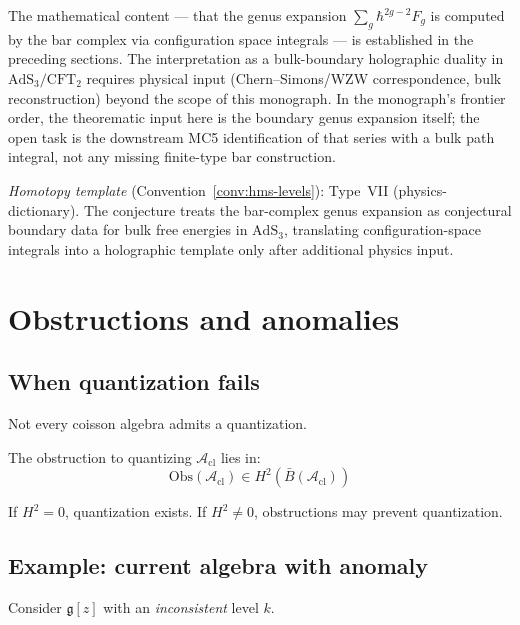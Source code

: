 \begin{remark}[Scope]
The mathematical content --- that the genus expansion $\sum_g \hbar^{2g-2} F_g$ is computed by the bar complex via configuration space integrals --- is established in the preceding sections.  The interpretation as a bulk-boundary holographic duality in $\mathrm{AdS}_3/\mathrm{CFT}_2$ requires physical input (Chern--Simons/WZW correspondence, bulk reconstruction) beyond the scope of this monograph.
In the monograph's frontier order, the theorematic input here is the boundary genus expansion itself; the open task is the downstream MC5 identification of that series with a bulk path integral, not any missing finite-type bar construction.

\emph{Homotopy template} (Convention~\ref{conv:hms-levels}): Type~VII (physics-dictionary).
The conjecture treats the bar-complex genus expansion as conjectural
boundary data for bulk free energies in $\mathrm{AdS}_3$, translating
configuration-space integrals into a holographic template only after
additional physics input.
\end{remark}

\section{Obstructions and anomalies}

\subsection{When quantization fails}

Not every coisson algebra admits a quantization.

\begin{theorem}
\label{thm:obstruction-quantization}
The obstruction to quantizing $\mathcal{A}_{\text{cl}}$ lies in:
\[\text{Obs}(\mathcal{A}_{\text{cl}}) \in H^2(\bar{B}(\mathcal{A}_{\text{cl}}))\]

If $H^2 = 0$, quantization exists. If $H^2 \neq 0$, obstructions may prevent quantization.
\end{theorem}

\subsection{Example: current algebra with anomaly}

Consider $\mathfrak{g}[z]$ with an \emph{inconsistent} level $k$.

